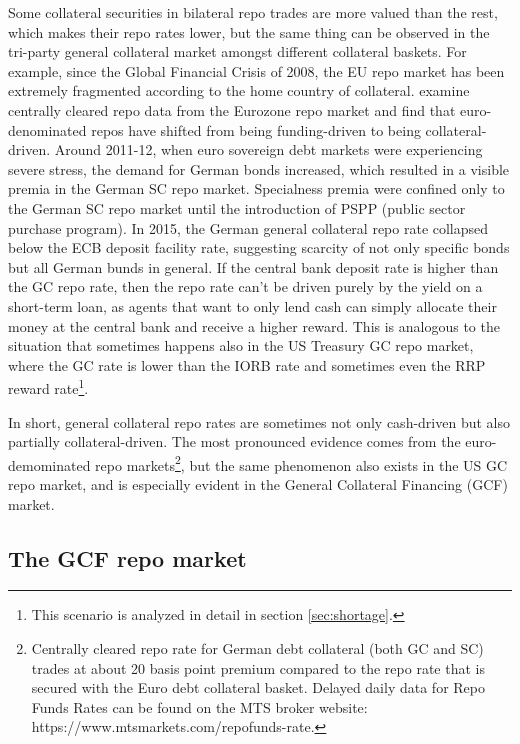 \documentclass[11pt,a4paper,english,oneside]{article}
\begin{document}
Some collateral securities in bilateral repo trades are more valued than the rest, which makes their repo rates lower, but the same thing can be observed in the tri-party general collateral market amongst different collateral baskets. For example, since the Global Financial Crisis of 2008, the EU repo market has been extremely fragmented according to the home country of collateral. \citet{schaffner2019} examine centrally cleared repo data from the Eurozone repo market and find that euro-denominated repos have shifted from being funding-driven to being collateral-driven. Around 2011-12, when euro sovereign debt markets were experiencing severe stress, the demand for German bonds increased, which resulted in a visible premia in the German SC repo market. Specialness premia were confined only to the German SC repo market until the introduction of PSPP (public sector purchase program). In 2015, the German general collateral repo rate collapsed below the ECB deposit facility rate, suggesting scarcity of not only specific bonds but all German bunds in general. If the central bank deposit rate is higher than the GC repo rate, then the repo rate can't be driven purely by the yield on a short-term loan, as agents that want to only lend cash can simply allocate their money at the central bank and receive a higher reward. This is analogous to the situation that sometimes happens also in the US Treasury GC repo market, where the GC rate is lower than the IORB rate and sometimes even the RRP reward rate\footnote{This scenario is analyzed in detail in section \ref{sec:shortage}.}.

In short, general collateral repo rates are sometimes not only cash-driven but also partially collateral-driven. The most pronounced evidence comes from the euro-demominated repo markets\footnote{Centrally cleared repo rate for German debt collateral (both GC and SC) trades at about 20 basis point premium compared to the repo rate that is secured with the Euro debt collateral basket. Delayed daily data for Repo Funds Rates can be found on the MTS broker website: https://www.mtsmarkets.com/repofunds-rate.}, but the same phenomenon also exists in the US GC repo market, and is especially evident in the General Collateral Financing (GCF) market.


\subsection{The GCF repo market}
\end{document}
